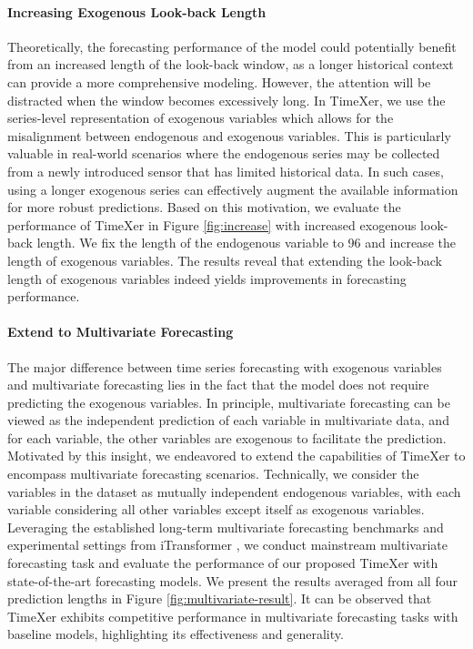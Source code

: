 \documentclass[nohyperref]{article}
\theoremstyle{plain}
\theoremstyle{definition}
\theoremstyle{remark}
\begin{document}
\paragraph{Increasing Exogenous Look-back Length}
Theoretically, the forecasting performance of the model could potentially benefit from an increased length of the look-back window, as a longer historical context can provide a more comprehensive modeling. However, the attention will be distracted when the window becomes excessively long. In TimeXer, we use the series-level representation of exogenous variables which allows for the misalignment between endogenous and exogenous variables. 
This is particularly valuable in real-world scenarios where the endogenous series may be collected from a newly introduced sensor that has limited historical data. In such cases, using a longer exogenous series can effectively augment the available information for more robust predictions. Based on this motivation, we evaluate the performance of TimeXer in Figure \ref{fig:increase} with increased exogenous look-back length. We fix the length of the endogenous variable to 96 and increase the length of exogenous variables. The results reveal that extending the look-back length of exogenous variables indeed yields improvements in forecasting performance.

\vspace{-10pt}
\paragraph{Extend to Multivariate Forecasting}
The major difference between time series forecasting with exogenous variables and multivariate forecasting lies in the fact that the model does not require predicting the exogenous variables. 
In principle, multivariate forecasting can be viewed as the independent prediction of each variable in multivariate data, and for each variable, the other variables are exogenous to facilitate the prediction.
Motivated by this insight, we endeavored to extend the capabilities of TimeXer to encompass multivariate forecasting scenarios. Technically, we consider the variables in the dataset as mutually independent endogenous variables, with each variable considering all other variables except itself as exogenous variables. 
Leveraging the established long-term multivariate forecasting benchmarks and experimental settings from iTransformer \cite{liu2023itransformer}, we conduct mainstream multivariate forecasting task and evaluate the performance of our proposed TimeXer with state-of-the-art forecasting models. We present the results averaged from all four prediction lengths in Figure \ref{fig:multivariate-result}. It can be observed that TimeXer exhibits competitive performance in multivariate forecasting tasks with baseline models, highlighting its effectiveness and generality.
\end{document}
